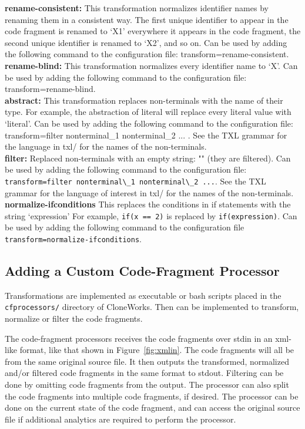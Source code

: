 \documentclass[]{article}
\begin{document}
	\textbf{rename-consistent:} This transformation normalizes identifier names by renaming them in a consistent way.  The first unique identifier to appear in the code fragment is renamed to `X1' everywhere it appears in the code fragment, the second unique identifier is renamed to `X2', and so on.  Can be used by adding the following command to the configuration file: transform=rename-consistent.\\
	
	\textbf{rename-blind:}  This transformation normalizes every identifier name to `X'.  Can be used by adding the following command to the configuration file: transform=rename-blind.\\
	
	\textbf{abstract:} This transformation replaces non-terminals with the name of their type.  For example, the abstraction of literal will replace every literal value with `literal'.  Can be used by adding the following command to the configuration file: transform=filter nonterminal\_1 nonterminal\_2 ... .  See the TXL grammar for the language in txl/ for the names of the non-terminals.\\
	
	\textbf{filter:} Replaced non-terminals with an empty string: "" (they are filtered).  Can be used by adding the following command to the configuration file: \verb|transform=filter nonterminal\_1 nonterminal\_2 ...|. See the TXL grammar for the language of interest in txl/ for the names of the non-terminals.\\
	
	\textbf{normalize-ifconditions}  This replaces the conditions in if statements with the string `expression'  For example, \verb|if(x == 2)| is replaced by \verb|if(expression)|.  Can be used by adding the following command to the configuration file \verb|transform=normalize-ifconditions|.
	
	\subsection{Adding a Custom Code-Fragment Processor}
	Transformations are implemented as executable or bash scripts placed in the \verb|cfprocessors/| directory of CloneWorks.  Then can be implemented to transform, normalize or filter the code fragments.
	
	The code-fragment processors receives the code fragments over stdin in an xml-like format, like that shown in Figure~\ref{fig:xmlin}.  The code fragments will all be from the same original source file.  It then outputs the transformed, normalized and/or filtered code fragments in the same format to stdout.  Filtering can be done by omitting code fragments from the output.  The processor can also split the code fragments into multiple code fragments, if desired.  The processor can be done on the current state of the code fragment, and can access the original source file if additional analytics are required to perform the processor.
	
\end{document}
